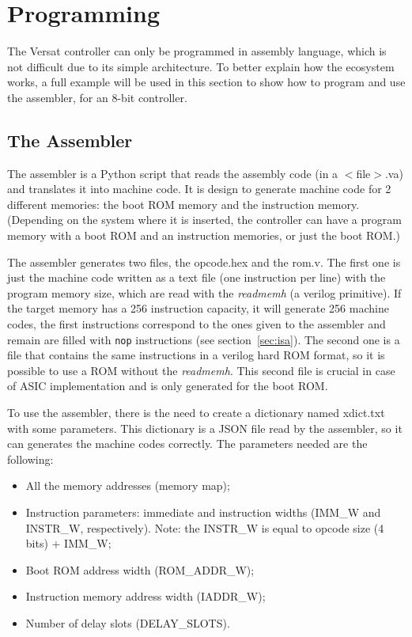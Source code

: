 \section{Programming}
\label{sec:progex}

The Versat controller can only be programmed in assembly language, which
is not difficult due to its simple architecture. To better explain
how the ecosystem works, a full example will be used in this section
to show how to program and use the assembler, for an 8-bit controller.

\subsection{The Assembler}

The assembler is a Python script that reads the assembly code (in a
$<$file$>$.va) and translates it into machine code. It is design to
generate machine code for 2 different memories: the boot ROM memory
and the instruction memory. (Depending on the system where it is
inserted, the controller can have a program memory with a boot ROM and
an instruction memories, or just the boot ROM.)

The assembler generates two files, the opcode.hex and the rom.v. The
first one is just the machine code written as a text file (one
instruction per line) with the program memory size, which are read
with the {\em readmemh} (a verilog primitive). If the target memory
has a 256 instruction capacity, it will generate 256 machine codes,
the first instructions correspond to the ones given to the assembler
and remain are filled with {\tt nop} instructions (see
section~\ref{sec:isa}). The second one is a file that contains the
same instructions in a verilog hard ROM format, so it is possible to
use a ROM without the {\em readmemh}. This second file is crucial in
case of ASIC implementation and is only generated for the boot ROM.

To use the assembler, there is the need to create a dictionary named
xdict.txt with some parameters. This dictionary is a JSON file read by
the assembler, so it can generates the machine codes correctly. The
parameters needed are the following:
\begin{itemize}
        \item All the memory addresses (memory map);
        \item Instruction parameters: immediate and instruction widths
          (IMM\_W and INSTR\_W, respectively). Note: the INSTR\_W is
          equal to opcode size (4 bits) + IMM\_W;
        \item Boot ROM address width (ROM\_ADDR\_W);
        \item Instruction memory address width (IADDR\_W);
        \item Number of delay slots (DELAY\_SLOTS).
\end{itemize}

